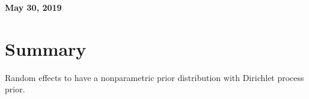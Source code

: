 \documentclass[11pt]{article}
\begin{document}
%

\newcommand{\Ito}{$It\hat{o}$'$s~Lemma$}

\newcommand\ind{\stackrel{\rm ind}{\sim}}
\newcommand\iid{\stackrel{\rm iid}{\sim}}
\renewcommand\c{\mathbf{c}}
\newcommand\y{\mathbf{y}}
\newcommand\z{\mathbf{z}}
\renewcommand\P{\mathbf{P}}
\newcommand\W{\mathbf{W}}
\newcommand\X{\mathbf{X}}
\newcommand\Y{\mathbf{Y}}
\newcommand\Z{\mathbf{Z}}
\newcommand\J{{\cal J}}
\newcommand\B{{\cal B}}
\newcommand\K{{\cal K}}
\newcommand\N{{\rm N}}
\newcommand\bs{\boldsymbol}
\newcommand\bth{\bs\theta}
\newcommand\bbe{\bs\beta}
\renewcommand\*{^\star}

\def\spacingset#1{\renewcommand{\baselinestretch}%
{#1}\small\normalsize} \spacingset{1}



  \bigskip
  \bigskip
  \bigskip
  \begin{center}
    {\LARGE\bf May 30, 2019 }
  \end{center}
  \medskip



\spacingset{1.45}

\section{Summary}
Random effects to have a nonparametric prior distribution with Dirichlet process prior.
\end{document}

